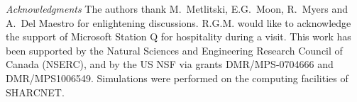 \documentclass[prl,aps,twocolumn,floatfix,amsmath,amssymb,superscriptaddress,tightenlines]{revtex4}
\begin{document}
{\it Acknowledgments} 
The authors thank M.~Metlitski, E.G.~Moon, R.~Myers and A.~Del Maestro for enlightening discussions. 
R.G.M. would like to acknowledge the support of Microsoft Station Q for hospitality during a visit.
This work has been supported by the Natural Sciences and Engineering
Research Council of Canada (NSERC), and by the US NSF via grants DMR/MPS-0704666 and DMR/MPS1006549.  Simulations were performed on the computing facilities of SHARCNET.



\end{document}

